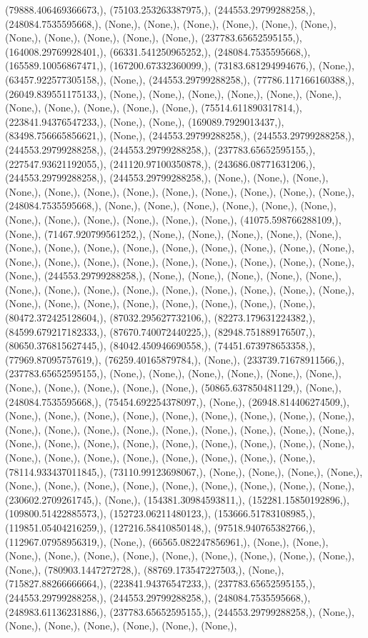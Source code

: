 \documentclass{article}
\begin{document}
(79888.406469366673,), (75103.253263387975,), (244553.29799288258,), (248084.7535595668,), (None,), (None,), (None,), (None,), (None,), (None,), (None,), (None,), (None,), (None,), (None,), (237783.65652595155,), (164008.29769928401,), (66331.541250965252,), (248084.7535595668,), (165589.10056867471,), (167200.67332360099,), (73183.681294994676,), (None,), (63457.922577305158,), (None,), (244553.29799288258,), (77786.117166160388,), (26049.839551175133,), (None,), (None,), (None,), (None,), (None,), (None,), (None,), (None,), (None,), (None,), (None,), (75514.611890317814,), (223841.94376547233,), (None,), (None,), (169089.7929013437,), (83498.756665856621,), (None,), (244553.29799288258,), (244553.29799288258,), (244553.29799288258,), (244553.29799288258,), (237783.65652595155,), (227547.93621192055,), (241120.97100350878,), (243686.08771631206,), (244553.29799288258,), (244553.29799288258,), (None,), (None,), (None,), (None,), (None,), (None,), (None,), (None,), (None,), (None,), (None,), (None,), (248084.7535595668,), (None,), (None,), (None,), (None,), (None,), (None,), (None,), (None,), (None,), (None,), (None,), (None,), (41075.598766288109,), (None,), (71467.920799561252,), (None,), (None,), (None,), (None,), (None,), (None,), (None,), (None,), (None,), (None,), (None,), (None,), (None,), (None,), (None,), (None,), (None,), (None,), (None,), (None,), (None,), (None,), (None,), (None,), (244553.29799288258,), (None,), (None,), (None,), (None,), (None,), (None,), (None,), (None,), (None,), (None,), (None,), (None,), (None,), (None,), (None,), (None,), (None,), (None,), (None,), (None,), (None,), (None,), (80472.372425128604,), (87032.295627732106,), (82273.179631224382,), (84599.679217182333,), (87670.740072440225,), (82948.751889176507,), (80650.376815627445,), (84042.450946690558,), (74451.673978653358,), (77969.87095757619,), (76259.40165879784,), (None,), (233739.71678911566,), (237783.65652595155,), (None,), (None,), (None,), (None,), (None,), (None,), (None,), (None,), (None,), (None,), (None,), (50865.637850481129,), (None,), (248084.7535595668,), (75454.692254378097,), (None,), (26948.814406274509,), (None,), (None,), (None,), (None,), (None,), (None,), (None,), (None,), (None,), (None,), (None,), (None,), (None,), (None,), (None,), (None,), (None,), (None,), (None,), (None,), (None,), (None,), (None,), (None,), (None,), (None,), (None,), (None,), (None,), (None,), (None,), (None,), (None,), (None,), (None,), (78114.933437011845,), (73110.99123698067,), (None,), (None,), (None,), (None,), (None,), (None,), (None,), (None,), (None,), (None,), (None,), (None,), (None,), (230602.2709261745,), (None,), (154381.30984593811,), (152281.15850192896,), (109800.51422885573,), (152723.06211480123,), (153666.51783108985,), (119851.05404216259,), (127216.58410850148,), (97518.940765382766,), (112967.07958956319,), (None,), (66565.082247856961,), (None,), (None,), (None,), (None,), (None,), (None,), (None,), (None,), (None,), (None,), (None,), (None,), (780903.1447272728,), (88769.173547227503,), (None,), (715827.88266666664,), (223841.94376547233,), (237783.65652595155,), (244553.29799288258,), (244553.29799288258,), (248084.7535595668,), (248983.61136231886,), (237783.65652595155,), (244553.29799288258,), (None,), (None,), (None,), (None,), (None,), (None,), (None,), 
\end{document}
